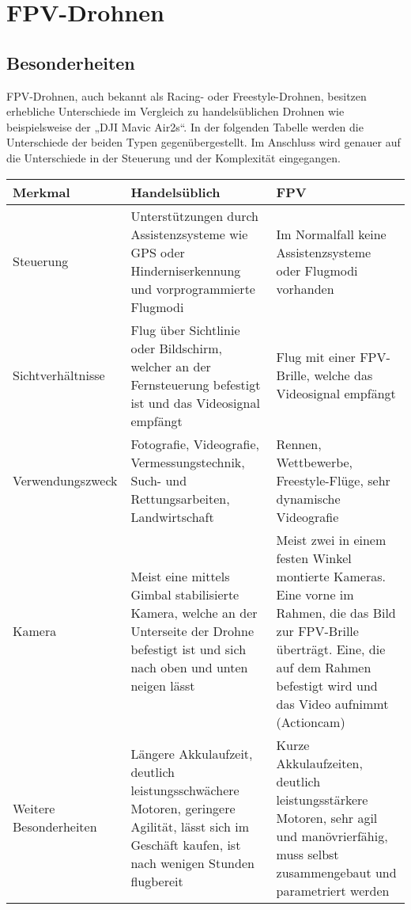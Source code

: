 
\section[FPV-Drohnen]{FPV-Drohnen}
    \subsection[Besonderheiten]{Besonderheiten}
        FPV-Drohnen, auch bekannt als Racing- oder Freestyle-Drohnen, besitzen erhebliche Unterschiede im Vergleich zu handelsüblichen Drohnen wie beispielsweise der „DJI Mavic Air2s“. In der folgenden Tabelle werden die Unterschiede der beiden Typen gegenübergestellt. Im Anschluss wird genauer auf die Unterschiede in der Steuerung und der Komplexität eingegangen.

        \vspace{0.5cm}
        \renewcommand{\arraystretch}{1.5}
        \begin{tabular}{p{3cm}p{5.86cm}p{5.86cm}}
            \toprule
            \textbf{Merkmal} & \textbf{Handelsüblich} & \textbf{FPV} \\
            \midrule
            Steuerung               & Unterstützungen durch Assistenzsysteme wie GPS oder Hinderniserkennung und vorprogrammierte Flugmodi                                                  & Im Normalfall keine Assistenzsysteme oder Flugmodi vorhanden \\
            Sichtverhältnisse       & Flug über Sichtlinie oder Bildschirm, welcher an der Fernsteuerung befestigt ist und das Videosignal empfängt                                         & Flug mit einer FPV-Brille, welche das Videosignal empfängt \\
            Verwendungszweck        & Fotografie, Videografie, Vermessungstechnik, Such- und Rettungsarbeiten, Landwirtschaft                                                               & Rennen, Wettbewerbe, Freestyle-Flüge, sehr dynamische Videografie \\
            Kamera                  & Meist eine mittels Gimbal stabilisierte Kamera, welche an der Unterseite der Drohne befestigt ist und sich nach oben und unten neigen lässt           & Meist zwei in einem festen Winkel montierte Kameras. Eine vorne im Rahmen, die das Bild zur FPV-Brille überträgt. Eine, die auf dem Rahmen befestigt wird und das Video aufnimmt (Actioncam) \\
            Weitere Besonderheiten  & Längere Akkulaufzeit, deutlich leistungsschwächere Motoren, geringere Agilität, lässt sich im Geschäft kaufen, ist nach wenigen Stunden flugbereit    & Kurze Akkulaufzeiten, deutlich leistungsstärkere Motoren, sehr agil und manövrierfähig, muss selbst zusammengebaut und parametriert werden \\
            \bottomrule
        \end{tabular}
        \vspace{0.5cm}


